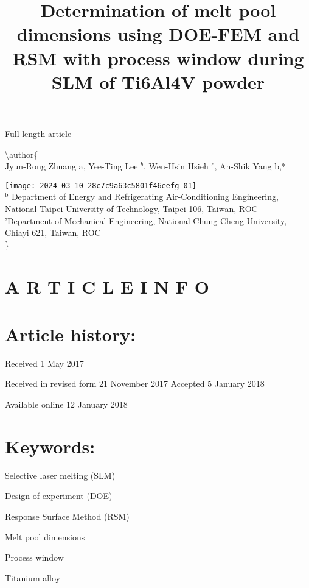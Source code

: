 \documentclass[10pt]{article}
\title{Determination of melt pool dimensions using DOE-FEM and RSM with process window during SLM of Ti6Al4V powder }
\author{}
\date{}
\begin{document}
\maketitle
Full length article

\textbackslash author\{\\
Jyun-Rong Zhuang a, Yee-Ting Lee ${ }^{b}$, Wen-Hsin Hsieh ${ }^{c}$, An-Shik Yang b,*

\texttt{[image: 2024\_03\_10\_28c7c9a63c5801f46eefg-01]} \\
 ${ }^{\mathrm{b}}$ Department of Energy and Refrigerating Air-Conditioning Engineering, National Taipei University of Technology, Taipei 106, Taiwan, ROC \\
 'Department of Mechanical Engineering, National Chung-Cheng University, Chiayi 621, Taiwan, ROC\\
\}

\section*{A R T I C L E I N F O}
\section*{Article history:}
Received 1 May 2017

Received in revised form 21 November 2017 Accepted 5 January 2018

Available online 12 January 2018

\section*{Keywords:}
Selective laser melting (SLM)

Design of experiment (DOE)

Response Surface Method (RSM)

Melt pool dimensions

Process window

Titanium alloy
\end{document}
